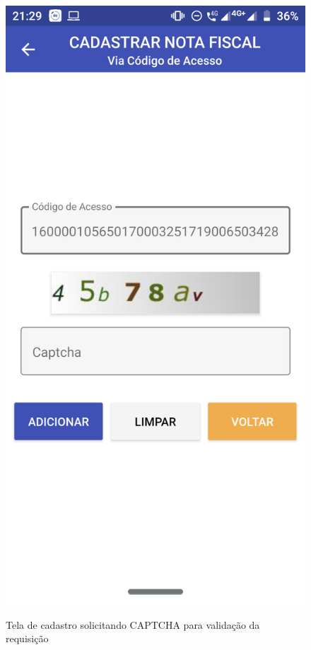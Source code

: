 \newpage
\begin{figure}[h]
    \centering
    \caption{Tela de cadastro solicitando CAPTCHA para validação da requisição}
    \includegraphics[scale=0.15]{tcc/figures/app/app_codigo_acesso_captcha.png}
    \label{appCodigoAcessoCaptchaFig}
\end{figure}

